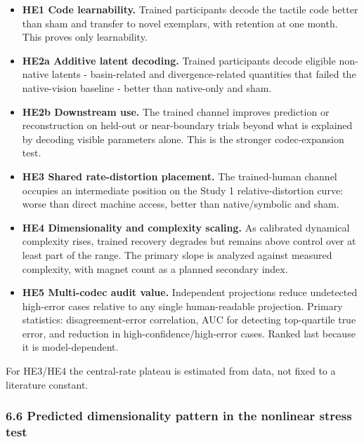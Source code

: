\documentclass[
  11pt,
]{article}
\providecommand{\tightlist}{%
  \setlength{\itemsep}{0pt}\setlength{\parskip}{0pt}}
\begin{document}
\begin{itemize}
\tightlist
\item
  \textbf{HE1 Code learnability.} Trained participants
  decode the tactile code better than sham and transfer
  to novel exemplars, with retention at one month. This
  proves only learnability.
\item
  \textbf{HE2a Additive latent decoding.} Trained
  participants decode eligible non-native latents -
  basin-related and divergence-related quantities that
  failed the native-vision baseline - better than
  native-only and sham.
\item
  \textbf{HE2b Downstream use.} The trained channel
  improves prediction or reconstruction on held-out or
  near-boundary trials beyond what is explained by
  decoding visible parameters alone. This is the
  stronger codec-expansion test.
\item
  \textbf{HE3 Shared rate-distortion placement.} The
  trained-human channel occupies an intermediate
  position on the Study 1 relative-distortion curve:
  worse than direct machine access, better than
  native/symbolic and sham.
\item
  \textbf{HE4 Dimensionality and complexity scaling.}
  As calibrated dynamical complexity rises, trained
  recovery degrades but remains above control over at
  least part of the range. The primary slope is
  analyzed against measured complexity, with magnet
  count as a planned secondary index.
\item
  \textbf{HE5 Multi-codec audit value.} Independent
  projections reduce undetected high-error cases
  relative to any single human-readable projection.
  Primary statistics: disagreement-error correlation,
  AUC for detecting top-quartile true error, and
  reduction in high-confidence/high-error cases. Ranked
  last because it is model-dependent.
\end{itemize}

For HE3/HE4 the central-rate plateau is estimated from
data, not fixed to a literature constant.

\subsubsection{6.6 Predicted dimensionality pattern in
the nonlinear stress
test}\label{predicted-dimensionality-pattern-in-the-nonlinear-stress-test}
\end{document}
